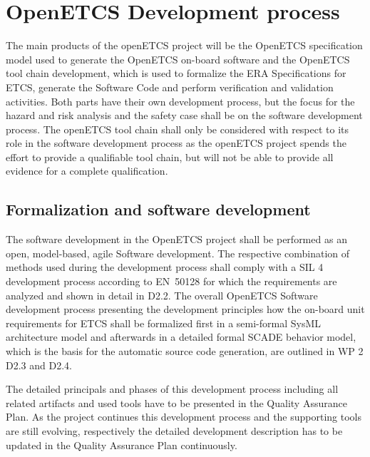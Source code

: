\documentclass{template/openetcs_report}
\begin{document}




\chapter{OpenETCS Development process}
\label{sec:development-process}

The main products of the openETCS project will be the OpenETCS specification model used to generate the OpenETCS on-board software and the OpenETCS tool chain development, which is used to formalize the ERA Specifications for ETCS, generate the Software Code and perform verification and validation activities. Both parts have their own development process, but the focus for the hazard and risk analysis and the safety case shall be on the software development process. The openETCS tool chain shall only be considered with respect to its role in the software development process as the openETCS project spends the effort to provide a qualifiable tool chain, but will not be able to provide all evidence for a complete qualification.

\section{Formalization and software development}

The software development in the OpenETCS project shall be performed as an open, model-based, agile Software development. The respective combination of methods used during the development process shall comply with a SIL 4 development process according to EN~50128 for which the requirements are analyzed and shown in detail in D2.2. The overall OpenETCS Software development process presenting the development principles how the on-board unit requirements for ETCS shall be formalized first in a semi-formal SysML architecture model and afterwards in a detailed formal SCADE behavior model, which is the basis for the automatic source code generation, are outlined in WP 2 D2.3 and D2.4. 

The detailed principals and phases of this development process including all related artifacts and used tools have to be presented in the Quality Assurance Plan.  As the project continues this development process and the supporting tools are still evolving, respectively the detailed development description has to be updated in the Quality Assurance Plan continuously.
\end{document}
